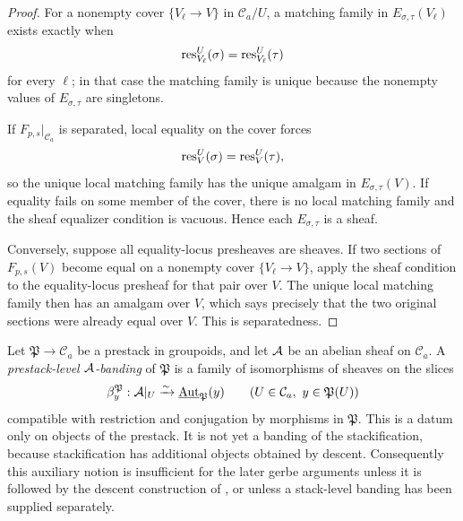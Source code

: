 \begin{proof}
For a nonempty cover $\{V_\ell\to V\}$ in $\mathcal C_a/U$, a matching family in $E_{\sigma,\tau}(V_\ell)$ exists exactly when
\[
\mathrm{res}_{V_\ell}^U(\sigma)=\mathrm{res}_{V_\ell}^U(\tau)
\]
for every $\ell$; in that case the matching family is unique because the nonempty values of $E_{\sigma,\tau}$ are singletons.

If $F_{p,s}|_{\mathcal C_a}$ is separated, local equality on the cover forces
\[
\mathrm{res}_V^U(\sigma)=\mathrm{res}_V^U(\tau),
\]
so the unique local matching family has the unique amalgam in $E_{\sigma,\tau}(V)$. If equality fails on some member of the cover, there is no local matching family and the sheaf equalizer condition is vacuous. Hence each $E_{\sigma,\tau}$ is a sheaf.

Conversely, suppose all equality-locus presheaves are sheaves. If two sections of $F_{p,s}(V)$ become equal on a nonempty cover $\{V_\ell\to V\}$, apply the sheaf condition to the equality-locus presheaf for that pair over $V$. The unique local matching family then has an amalgam over $V$, which says precisely that the two original sections were already equal over $V$. This is separatedness.
\end{proof}

\begin{definition}\label{def:prestack-level-banding}
Let $\mathfrak P\to\mathcal C_a$ be a prestack in groupoids, and let $\mathcal{A}$
be an abelian sheaf on $\mathcal C_a$. A \emph{prestack-level $\mathcal{A}$-banding}
of $\mathfrak P$ is a family of isomorphisms of sheaves on the slices
\[
\beta^{\mathfrak P}_y:\mathcal{A}|_U\xrightarrow{\sim}
\underline{\mathrm{Aut}}_{\mathfrak P}(y)
\qquad (U\in\mathcal C_a,\ y\in\mathfrak P(U))
\]
compatible with restriction and conjugation by morphisms in $\mathfrak P$.
This is a datum only on objects of the prestack. It is not yet a banding of
the stackification, because stackification has additional objects obtained by
descent. Consequently this auxiliary notion is insufficient for the later gerbe
arguments unless it is followed by the descent construction of
, or unless a stack-level banding has
been supplied separately.
\end{definition}

